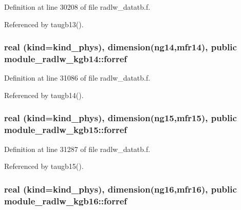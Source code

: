 Definition at line 30208 of file radlw\+\_\+datatb.\+f.



Referenced by taugb13().

\subsubsection[{\texorpdfstring{forref}{forref}}]{\setlength{\rightskip}{0pt plus 5cm}real (kind=kind\+\_\+phys), dimension(ng14,mfr14), public module\+\_\+radlw\+\_\+kgb14\+::forref}\hypertarget{group__module__radlw__main_ga8478067cb8a07a02b56c09fa3c73eb67}{}\label{group__module__radlw__main_ga8478067cb8a07a02b56c09fa3c73eb67}


Definition at line 31086 of file radlw\+\_\+datatb.\+f.



Referenced by taugb14().

\subsubsection[{\texorpdfstring{forref}{forref}}]{\setlength{\rightskip}{0pt plus 5cm}real (kind=kind\+\_\+phys), dimension(ng15,mfr15), public module\+\_\+radlw\+\_\+kgb15\+::forref}\hypertarget{group__module__radlw__main_gada70146d20f89f059141aa4cf58a0894}{}\label{group__module__radlw__main_gada70146d20f89f059141aa4cf58a0894}


Definition at line 31287 of file radlw\+\_\+datatb.\+f.



Referenced by taugb15().

\subsubsection[{\texorpdfstring{forref}{forref}}]{\setlength{\rightskip}{0pt plus 5cm}real (kind=kind\+\_\+phys), dimension(ng16,mfr16), public module\+\_\+radlw\+\_\+kgb16\+::forref}\hypertarget{group__module__radlw__main_ga4402ed68e18459813a6c9ede5d6ba9cc}{}\label{group__module__radlw__main_ga4402ed68e18459813a6c9ede5d6ba9cc}


